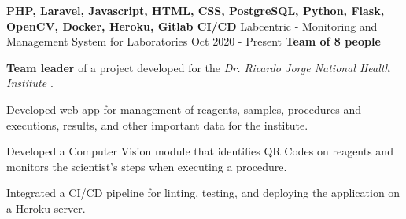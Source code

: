   \cventry
    {\textbf{PHP, Laravel, Javascript, HTML, CSS, PostgreSQL, Python, Flask, OpenCV, Docker, Heroku, Gitlab CI/CD}} %
    {Labcentric - Monitoring and Management System for Laboratories \href{https://laboratorio-4.herokuapp.com/}{\faExternalLink}} %
    {Oct 2020 - Present} %
    {\textbf{Team of 8 people}} %
    {
      \begin{cvitems} %
        \item {\textbf{Team leader} of a project developed for the \textit{Dr. Ricardo Jorge National Health Institute} \href{http://www.insa.pt}{\faExternalLink}.}
        \item {Developed web app for management of reagents, samples, procedures and executions, results, and other important data for the institute.}
        \item {Developed a Computer Vision module that identifies QR Codes on reagents and monitors the scientist's steps when executing a procedure.}
        \item {Integrated a CI/CD pipeline for linting, testing, and deploying the application on a Heroku server.}
      \end{cvitems}
    }